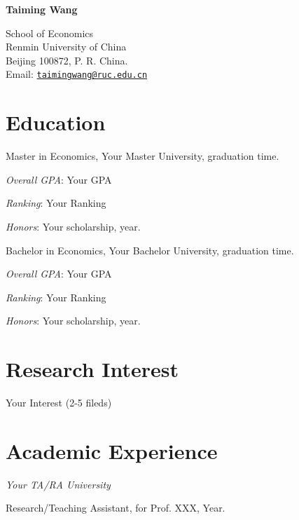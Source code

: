 \documentclass[letterpaper]{article}
\def\name{Taiming Wang}
\renewenvironment{itemize}{
  \begin{list}{}{
    \setlength{\leftmargin}{1em}
  }
}{
  \end{list}
}
\begin{document}
\centerline{\huge\bf \name}
\vspace{0.25in}
\begin{minipage}[t]{0.8\textwidth}
School of Economics\\
Renmin University of China\\
Beijing 100872, P. R. China.\\
Email: \href{mailto:taimingwang@ruc.edu.cn}{\tt taimingwang@ruc.edu.cn}\\
\end{minipage}

\section*{Education}
\begin{itemize}
\item Master in Economics, Your Master University, graduation time.
    \begin{itemize}
    \item \textit{Overall GPA}: Your GPA
    \item \textit{Ranking}: Your Ranking
    \item \textit{Honors}: Your scholarship, year.
    \end{itemize}
\item Bachelor in Economics, Your Bachelor University, graduation time.
    \begin{itemize}
    \item \textit{Overall GPA}: Your GPA
    \item \textit{Ranking}: Your Ranking
    \item \textit{Honors}: Your scholarship, year.
    \end{itemize}
\end{itemize}

\section*{Research Interest}
Your Interest (2-5 fileds)

\section*{Academic Experience}
\begin{itemize}
\item \emph{Your TA/RA University}
\begin{itemize}
\item Research/Teaching  Assistant,
  for Prof. XXX,
  Year.
\end{itemize}
\end{itemize}
\end{document}
